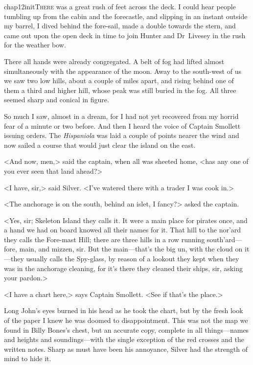 
\lettrine{chap12initT}{here} was a great rush of feet across the deck. I could hear people tumbling up from the cabin and the forecastle, and slipping in an instant outside my barrel, I dived behind the fore-sail, made a double towards the stern, and came out upon the open deck in time to join Hunter and Dr~Livesey in the rush for the weather bow.

There all hands were already congregated. A belt of fog had lifted almost simultaneously with the appearance of the moon. Away to the south-west of us we saw two low hills, about a couple of miles apart, and rising behind one of them a third and higher hill, whose peak was still buried in the fog. All three seemed sharp and conical in figure.

So much I saw, almost in a dream, for I had not yet recovered from my horrid fear of a minute or two before. And then I heard the voice of Captain Smollett issuing orders. The \textit{Hispaniola} was laid a couple of points nearer the wind and now sailed a course that would just clear the island on the east.

<And now, men,> said the captain, when all was sheeted home, <has any one of you ever seen that land ahead?>

<I have, sir,> said Silver. <I've watered there with a trader I was cook in.>

<The anchorage is on the south, behind an islet, I fancy?> asked the captain.

<Yes, sir; Skeleton Island they calls it. It were a main place for pirates once, and a hand we had on board knowed all their names for it. That hill to the nor'ard they calls the Fore-mast Hill; there are three hills in a row running south'ard—fore, main, and mizzen, sir. But the main—that's the big un, with the cloud on it—they usually calls the Spy-glass, by reason of a lookout they kept when they was in the anchorage cleaning, for it's there they cleaned their ships, sir, asking your pardon.>

<I have a chart here,> says Captain Smollett. <See if that's the place.>

Long John's eyes burned in his head as he took the chart, but by the fresh look of the paper I knew he was doomed to disappointment. This was not the map we found in Billy Bones's chest, but an accurate copy, complete in all things—names and heights and soundings—with the single exception of the red crosses and the written notes. Sharp as must have been his annoyance, Silver had the strength of mind to hide it.

